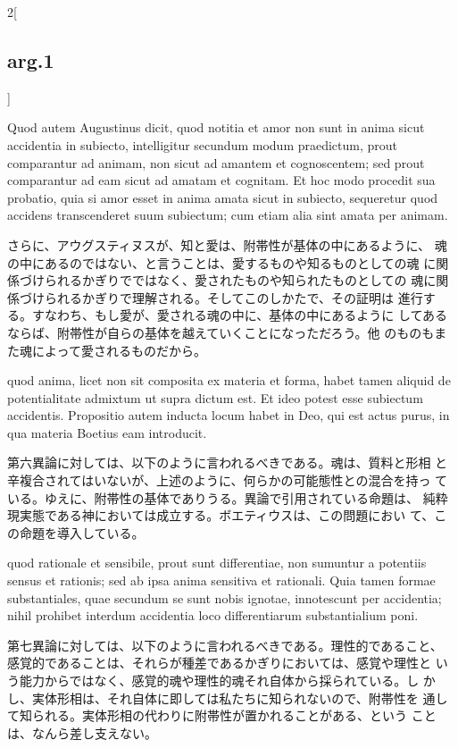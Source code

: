 \documentclass[paper=a4paper,fontsize=10pt,jafontsize=9pt,titlepage]{jlreq}
\begin{document}
\begin{paracol}{2}[\subsection{arg.1}]
\switchcolumn*

 Quod autem Augustinus dicit, quod notitia et amor non sunt
in anima sicut accidentia in subiecto, intelligitur secundum modum
praedictum, prout comparantur ad animam, non sicut ad amantem et
cognoscentem; sed prout comparantur ad eam sicut ad amatam et
cognitam. Et hoc modo procedit sua probatio, quia si amor esset in
anima amata sicut in subiecto, sequeretur quod accidens transcenderet
suum subiectum; cum etiam alia sint amata per animam.

\switchcolumn

 さらに、アウグスティヌスが、知と愛は、附帯性が基体の中にあるように、
 魂の中にあるのではない、と言うことは、愛するものや知るものとしての魂
 に関係づけられるかぎりでではなく、愛されたものや知られたものとしての
 魂に関係づけられるかぎりで理解される。そしてこのしかたで、その証明は
 進行する。すなわち、もし愛が、愛される魂の中に、基体の中にあるように
 してあるならば、附帯性が自らの基体を越えていくことになっただろう。他
 のものもまた魂によって愛されるものだから。



  quod anima, licet non sit composita ex
materia et forma, habet tamen aliquid de potentialitate admixtum ut
supra dictum est. Et ideo potest esse subiectum accidentis. Propositio
autem inducta locum habet in Deo, qui est actus purus, in qua materia
Boetius eam introducit.

\switchcolumn


 第六異論に対しては、以下のように言われるべきである。魂は、質料と形相
 と辛複合されてはいないが、上述のように、何らかの可能態性との混合を持っ
 ている。ゆえに、附帯性の基体でありうる。異論で引用されている命題は、
 純粋現実態である神においては成立する。ボエティウスは、この問題におい
 て、この命題を導入している。

  quod rationale et sensibile, prout
sunt differentiae, non sumuntur a potentiis sensus et rationis; sed ab
ipsa anima sensitiva et rationali. Quia tamen formae substantiales,
quae secundum se sunt nobis ignotae, innotescunt per accidentia; nihil
prohibet interdum accidentia loco differentiarum substantialium poni.

\switchcolumn

 第七異論に対しては、以下のように言われるべきである。理性的であること、
 感覚的であることは、それらが種差であるかぎりにおいては、感覚や理性と
 いう能力からではなく、感覚的魂や理性的魂それ自体から採られている。し
 かし、実体形相は、それ自体に即しては私たちに知られないので、附帯性を
 通して知られる。実体形相の代わりに附帯性が置かれることがある、という
 ことは、なんら差し支えない。


\end{paracol}
\end{document}
